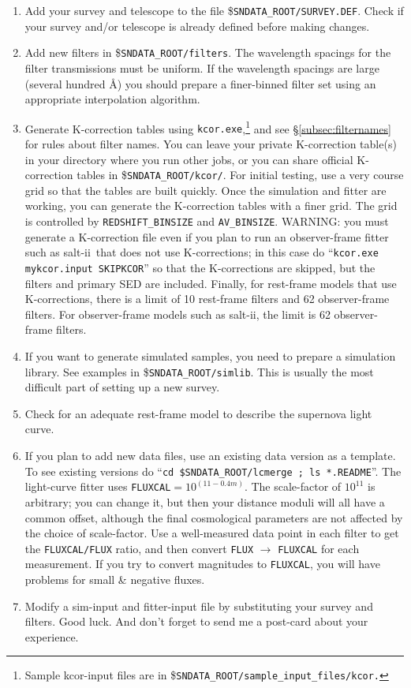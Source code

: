 \documentclass[12pt]{article}
\newcommand{\SALTII}{{\sc salt-ii}}
\newcommand{\sndataroot}{{\tt SNDATA\_ROOT}}
\newcommand{\MXFILTOBS}{62}
\newcommand{\MXFILTREST}{10}
\begin{document}
\begin{enumerate}
  \item	Add your survey and telescope to the file
      	{\$\sndataroot}{\tt /SURVEY.DEF}. Check if your
      	survey and/or telescope is already defined before
      	making changes.
%
  \item	Add new filters in {\$\sndataroot}{\tt /filters}.
       	The wavelength spacings for the filter transmissions
       	must be uniform. If the wavelength spacings are large
      	(several hundred \AA)
       	you should prepare a finer-binned filter set using
      	an appropriate interpolation algorithm.
%
 \item	Generate K-correction tables using 
 	{\tt kcor.exe},\footnote{Sample kcor-input files are in
	{\$\sndataroot}{\tt /sample\_input\_files/kcor.}}
	and see \S\ref{subsec:filternames} for rules about filter names.
	You can leave your private K-correction table(s) in your 
	directory where you run other jobs, or you can share 
	official K-correction tables in {\$\sndataroot}{\tt /kcor/}.
	For initial testing,
	use a very course grid so that the tables are built quickly.
        Once the simulation and fitter are working, you can generate
        the K-correction tables with a finer grid.
        The grid is controlled by {\tt REDSHIFT\_BINSIZE}
        and {\tt AV\_BINSIZE}.  WARNING: you must generate
	a K-correction file even if you plan to run an observer-frame
  	fitter such as \SALTII\ that does not use K-corrections;
	in this case do ``{\tt kcor.exe mykcor.input SKIPKCOR}''
	so that the K-corrections are skipped, but the filters
	and primary SED are included.	
	Finally, for rest-frame models that use K-corrections,
	there is a limit of {\MXFILTREST} rest-frame filters and 
	{\MXFILTOBS} observer-frame
	filters. For observer-frame models such as \SALTII, 
	the limit is {\MXFILTOBS} observer-frame filters.
%
 \item 	If you want to generate simulated samples, you need to
	prepare a simulation library. See examples in
	{\$\sndataroot}{\tt /simlib}. This is usually the most
	difficult part of setting up a new survey.
%
\item 	Check for an adequate rest-frame model to describe 
	the supernova light curve.
%
\item   If you plan to add new data files, use an existing data version
	as a template.  To  see existing versions do
	``{\tt cd \${\sndataroot}{\tt /lcmerge} ; ls *.README}''.
	The light-curve fitter uses {\tt FLUXCAL}$ = 10^{(11-0.4m)}$.
	The scale-factor of $10^{11}$ is arbitrary; you can change it,
  	but then your distance moduli will all have a common offset, 
	although the final cosmological parameters are not affected
	by the choice of scale-factor.
%
	Use a well-measured data point in each filter to get the 
	{\tt FLUXCAL/FLUX} ratio, and then convert 
	{\tt FLUX} $\to$ {\tt FLUXCAL} for each measurement.
	If you try to convert magnitudes to {\tt FLUXCAL}, 
	you will have problems for small \& negative fluxes.
%
 \item 	Modify a sim-input and fitter-input file by substituting
	your survey and filters. Good luck. And don't forget to send
	me a post-card about your experience.
\end{enumerate}
\end{document}
